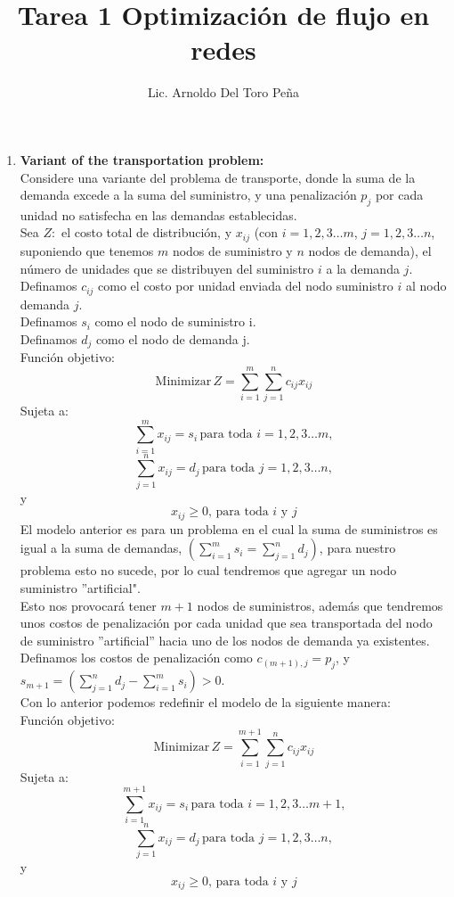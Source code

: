 \documentclass[a4paper, 12pt]{article}
\author{Lic. Arnoldo Del Toro Peña}
\title{Tarea 1 Optimización de flujo en redes}
\begin{document}
\maketitle
\begin{enumerate}
      \item {\bfseries Variant of the transportation problem: }
            \\ Considere una variante del problema de transporte, donde la suma de la demanda excede a la suma del suministro, y una penalización $p_j$ por cada unidad no satisfecha en las demandas establecidas.
            \\ Sea $Z:$ el costo total de distribución, y $x_{ij}$  (con $i= 1,2,3 \dots m$, $j=1,2,3 \dots n$, suponiendo que tenemos $m$ nodos de suministro y $n$ nodos de demanda), el número de unidades que se distribuyen del suministro $i$ a la demanda $j$.
            \\ Definamos $c_{ij}$ como el costo por unidad enviada del nodo suministro  $i$ al nodo demanda $j$.
            \\ Definamos $s_{i}$ como el nodo de suministro i.
            \\ Definamos $d_j$ como el nodo de demanda j.
            \\ Función objetivo:
            \[\text{Minimizar} \, Z = \sum_{i=1} ^{m} { \sum_{j=1}^{n} { c_{ij} x_{ij} }  } \]
            Sujeta a:
            \[ \sum_{i=1}^{m} {x_{ij}} = s_{i} \, \text{para toda } i = 1,2,3 \dots m, \]
            \[ \sum_{j=1}^{n} {x_{ij}} = d_{j} \, \text{para toda } j = 1,2,3 \dots n, \]
            y
            \[ x_{ij} \geq 0, \, \text{para toda } i \text{ y } j \]
            El modelo anterior es para un problema en el cual la suma de suministros es igual a la suma de demandas, $\left( \displaystyle \sum_{i=1}^{m} {s_i} = \sum_{j=1}^{n} {d_j} \right)$, para nuestro problema esto no sucede, por lo cual tendremos que agregar un nodo  suministro ''artificial".
            \\ Esto nos provocará tener $m+1$ nodos de suministros, además que tendremos unos costos de penalización por cada unidad que sea transportada del nodo de suministro ''artificial'' hacia uno de los nodos de demanda ya existentes.
            \\ Definamos los costos de penalización como $c_{(m+1),j} = p_j$, y \\ $s_{m+1} = \left( \displaystyle \sum_{j=1}^{n} {d_j} - \sum_{i=1}^{m} {s_i}  \right) > 0.$
            \\ Con lo anterior podemos redefinir el modelo de la siguiente manera:
            \\ Función objetivo:
            \[\text{Minimizar} \, Z = \sum_{i=1} ^{m+1} { \sum_{j=1}^{n} { c_{ij} x_{ij} }  } \]
            Sujeta a:
            \[ \sum_{i=1}^{m+1} {x_{ij}} = s_{i} \, \text{para toda } i = 1,2,3 \dots m+1, \]
            \[ \sum_{j=1}^{n} {x_{ij}} = d_{j} \, \text{para toda } j = 1,2,3 \dots n, \]
            y
            \[ x_{ij} \geq 0, \, \text{para toda } i \text{ y } j \]


\end{enumerate}
\end{document}
